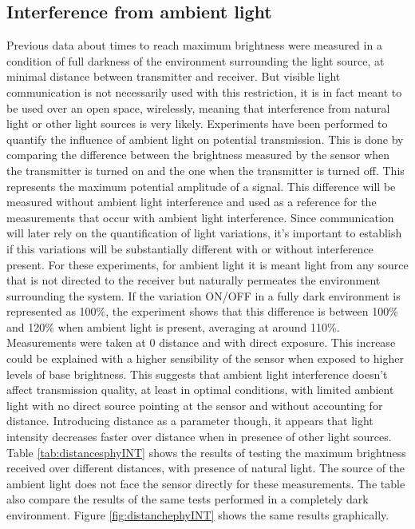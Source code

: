 \subsection{Interference from ambient light}
Previous data about times to reach maximum brightness were measured in a condition of full darkness of the environment surrounding the light source, at minimal distance between transmitter and receiver.
But visible light communication is not necessarily used with this restriction, it is in fact meant to be used over an open space, wirelessly,  meaning that interference from natural light or other light sources is very likely.
 Experiments have been performed to quantify the influence of ambient light on potential transmission.
 This is done by comparing the difference between the brightness measured by the sensor when the transmitter is turned on and the one when the transmitter is turned off.
 This represents the maximum potential amplitude of a signal.
 This difference will be measured without ambient light interference and used as a reference for the measurements that occur with ambient light interference.
 Since communication  will later rely on the quantification of light variations, it's important to establish if this variations will be substantially different with or without interference present.
 For these experiments, for ambient light it is meant light from any source that is not directed to the receiver but naturally permeates the environment surrounding the system.
 If the variation ON/OFF in a fully dark environment is represented as 100\%, the experiment shows that this difference is between 100\% and 120\% when ambient light is present, averaging at around 110\%. 
Measurements were taken at 0 distance and with direct exposure.
This increase could be explained with a higher sensibility of the sensor when exposed to higher levels of base brightness.
This suggests that ambient light interference doesn't affect transmission quality, at least in optimal conditions, with limited ambient light with no direct source pointing at the sensor and without accounting for distance.
Introducing distance as a parameter though, it appears that light intensity decreases faster over distance when in presence of other light sources.
Table \ref{tab:distancesphyINT} shows the results of testing the maximum brightness received over different distances, with presence of natural light.
The source of the ambient light does not face the sensor directly for these measurements.
The table also compare the results of the same tests performed in a completely dark environment.
Figure \ref{fig:distanchephyINT} shows the same results graphically.


